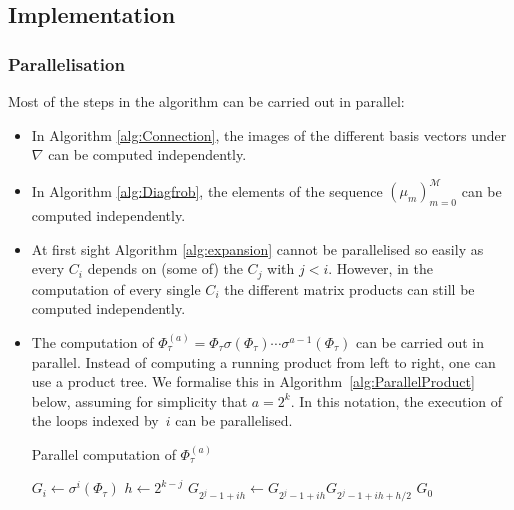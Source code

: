 \documentclass[a4paper,11pt]{article}
\numberwithin{equation}{section}
\theoremstyle{definition}
\begin{document}
\subsection{Implementation}

\subsubsection{Parallelisation}

Most of the steps in the algorithm can be
carried out in parallel:
\begin{itemize}
\item In Algorithm \ref{alg:Connection}, the images of the different 
      basis vectors under $\nabla$ can be computed independently.
\item In Algorithm \ref{alg:Diagfrob}, the elements of the sequence 
      $(\mu_m)_{m=0}^{\mathcal{M}}$ can be computed independently.
\item At first sight Algorithm \ref{alg:expansion} cannot be parallelised so easily 
      as every $C_{i}$ depends on (some of) the $C_{j}$ with $j < i$. However, in
      the computation of every single $C_i$ the different matrix products can
      still be computed independently.
\item The computation of 
      $\Phi_{\tau}^{(a)}=\Phi_{\tau} \sigma(\Phi_{\tau}) \dotsm \sigma^{a-1}(\Phi_{\tau})$ 
      can be carried out in parallel.  Instead of computing 
      a running product from left to right, one can use a 
      product tree.  We formalise this in Algorithm~\ref{alg:ParallelProduct} below, 
      assuming for simplicity that $a = 2^k$.  In this notation, the execution 
      of the loops indexed by~$i$ can be parallelised.
      \begin{algorithm}
      \caption{Parallel computation of $\Phi_{\tau}^{(a)}$}
      \label{alg:ParallelProduct}
      \begin{algorithmic}
      \vspace{1mm}
          \State $G_i \gets \sigma^{i}(\Phi_{\tau})$
      \EndFor
          \State $h \gets 2^{k-j}$
          \State $G_{2^j-1 + ih} \gets G_{2^j-1 + i h} G_{2^j-1 + ih + h/2}$
          \EndFor
      \EndFor
      \Return $G_0$
      \end{algorithmic}
      \end{algorithm}
\end{itemize}
\end{document}
